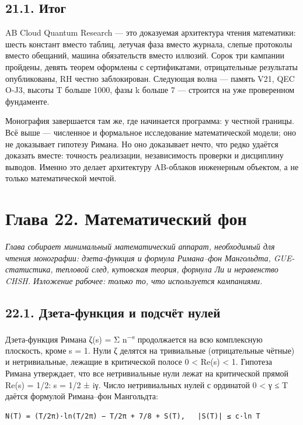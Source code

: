 \documentclass[11pt,a4paper]{article}
\begin{document}
\subsection{21.1. Итог}

AB Cloud Quantum Research — это доказуемая архитектура чтения математики: шесть констант вместо таблиц, летучая фаза вместо журнала, слепые протоколы вместо обещаний, машина обязательств вместо иллюзий. Сорок три кампании пройдены, девять теорем оформлены с сертификатами, отрицательные результаты опубликованы, RH честно заблокирован. Следующая волна — память V21, QEC O-J3, высоты T больше 1000, фазы k больше 7 — строится на уже проверенном фундаменте.

Монография завершается там же, где начинается программа: у честной границы. Всё выше — численное и формальное исследование математической модели; оно не доказывает гипотезу Римана. Но оно доказывает нечто, что редко удаётся доказать вместе: точность реализации, независимость проверки и дисциплину выводов. Именно это делает архитектуру AB-облаков инженерным объектом, а не только математической мечтой.

\section{Глава 22. Математический фон}

\noindent\textit{\color{copper}Глава собирает минимальный математический аппарат, необходимый для чтения монографии: дзета-функция и формула Римана–фон Мангольдта, GUE-статистика, тепловой след, кутовская теория, формула Ли и неравенство CHSH. Изложение рабочее: только то, что используется кампаниями.}

\subsection{22.1. Дзета-функция и подсчёт нулей}

Дзета-функция Римана ζ(s) = Σ n\textsuperscript{−s} продолжается на всю комплексную плоскость, кроме s = 1. Нули ζ делятся на тривиальные (отрицательные чётные) и нетривиальные, лежащие в критической полосе 0 < Re(s) < 1. Гипотеза Римана утверждает, что все нетривиальные нули лежат на критической прямой Re(s) = 1/2: s = 1/2 ± iγ. Число нетривиальных нулей с ординатой 0 < γ ≤ T даётся формулой Римана–фон Мангольдта:

\begin{verbatim}
N(T) = (T/2π)·ln(T/2π) − T/2π + 7/8 + S(T),   |S(T)| ≤ c·ln T
\end{verbatim}
\end{document}
